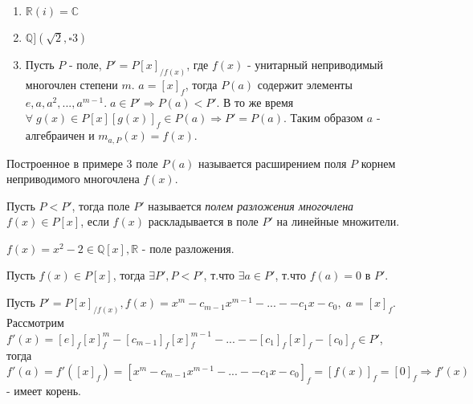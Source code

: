 \begin{example}
  \begin{enumerate}
    \item $\mathbb{R}(i) = \mathbb{C}$
    \item $\mathbb{Q}](\sqrt{2}, \square{3})$
    \item Пусть $P$ - поле, $P' = P[x]_{/f(x)}$, где $f(x)$ - унитарный неприводимый многочлен степени $m$.
    $a = [x]_{f}$, тогда $P(a)$ содержит элементы $e,a,a^2,...,a^{m-1}. \; a \in P' \Rightarrow P(a) < P'.$ В то же время $\forall\; g(x) \in P[x] [g(x)]_{f} \in P(a) \Rightarrow P' = P(a).$
    Таким образом $a$ - алгебраичен и $m_{a,P}(x) = f(x)$.
  \end{enumerate}
\end{example}

\begin{defs}
  Построенное в примере 3 поле $P(a)$ называется расширением поля $P$ корнем неприводимого многочлена $f(x)$.
\end{defs}

\begin{defs}
  Пусть $P < P'$, тогда поле $P'$ называется \textit{полем разложения многочлена $f(x) \in P[x]$}, если $f(x)$ раскладывается в поле
  $P'$ на линейные множители.
\end{defs}

\begin{example}
  $f(x) = x^2 - 2 \in \mathbb{Q}[x], \mathbb{R}$ - поле разложения.
\end{example}


\begin{proofs}
	Пусть $f(x) \in P[x]$, тогда $\exists P', P < P'$, т.что $\exists a \in P'$, т.что $f(a) = 0$ в $P'$.
  \begin{dokvo}
    Пусть $P' = P[x]_{/f(x)}, f(x) = x^m - c_{m-1}x^{m-1} - ... - - c_1x - c_0,\;a = [x]_{f}$.
    Рассмотрим $f'(x) = [e]_f[x]_f^m - [c_{m-1}]_f[x]_f^{m-1} - ... - - [c_1]_f[x]_f - [c_0]_f \in P'$, тогда
    $f'(a) = f'([x]_f) = [x^m - c_{m-1}x^{m-1} - ... - - c_1x - c_0]_f = [f(x)]_f = [0]_f \Rightarrow f'(x)$ - имеет корень.
	\end{dokvo}
\end{proofs}

